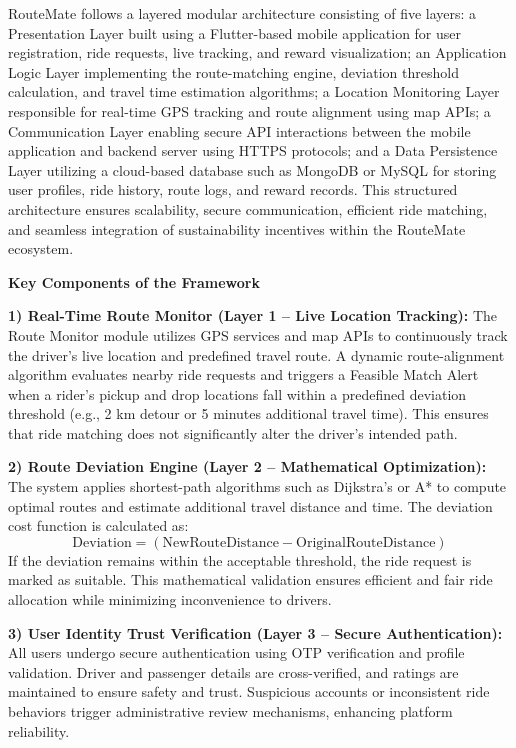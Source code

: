 \documentclass[conference]{IEEEtran}
\begin{document}
RouteMate follows a layered modular architecture consisting of five layers: a Presentation Layer built using a Flutter-based mobile application for user registration, ride requests, live tracking, and reward visualization; an Application Logic Layer implementing the route-matching engine, deviation threshold calculation, and travel time estimation algorithms; a Location Monitoring Layer responsible for real-time GPS tracking and route alignment using map APIs; a Communication Layer enabling secure API interactions between the mobile application and backend server using HTTPS protocols; and a Data Persistence Layer utilizing a cloud-based database such as MongoDB or MySQL for storing user profiles, ride history, route logs, and reward records. This structured architecture ensures scalability, secure communication, efficient ride matching, and seamless integration of sustainability incentives within the RouteMate ecosystem.

\textbf{Key Components of the Framework}

\textbf{1) Real-Time Route Monitor (Layer 1 – Live Location Tracking):} The Route Monitor module utilizes GPS services and map APIs to continuously track the driver’s live location and predefined travel route. A dynamic route-alignment algorithm evaluates nearby ride requests and triggers a Feasible Match Alert when a rider’s pickup and drop locations fall within a predefined deviation threshold (e.g., 2 km detour or 5 minutes additional travel time). This ensures that ride matching does not significantly alter the driver’s intended path.

\vspace{4pt}

\textbf{2) Route Deviation Engine (Layer 2 – Mathematical Optimization):} The system applies shortest-path algorithms such as Dijkstra’s or A* to compute optimal routes and estimate additional travel distance and time. The deviation cost function is calculated as:
\[
\text{Deviation} = (\text{NewRouteDistance} - \text{OriginalRouteDistance})
\]
If the deviation remains within the acceptable threshold, the ride request is marked as suitable. This mathematical validation ensures efficient and fair ride allocation while minimizing inconvenience to drivers.

\vspace{4pt}

\textbf{3) User Identity Trust Verification (Layer 3 – Secure Authentication):} All users undergo secure authentication using OTP verification and profile validation. Driver and passenger details are cross-verified, and ratings are maintained to ensure safety and trust. Suspicious accounts or inconsistent ride behaviors trigger administrative review mechanisms, enhancing platform reliability.
\end{document}
